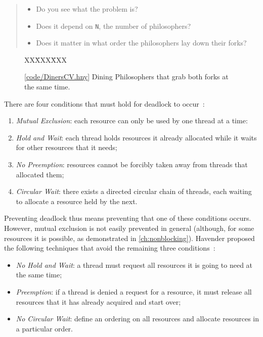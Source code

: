 \documentclass{report}
\newcommand{\harmonysource}[1]{
\begin{tabbing}
XX\=XXX\=XXX\kill
    
\end{tabbing}
}
\newcommand{\harmonylink}[1]{%
[\href{https://harmony.cs.cornell.edu/#1}{\underline{#1}}]%
}
\newenvironment{code}{
\tcolorbox
}{
\endtcolorbox
}
\begin{document}
\begin{quote}
\begin{itemize}
\item Do you see what the problem is?
\item Does it depend on \texttt{N}, the number of philosophers?
\item Does it matter in what order the philosophers lay down their forks?
\end{itemize}
\end{quote}


\begin{figure}
\begin{code}
\harmonysource{DinersCV}
\end{code}
\caption{\harmonylink{code/DinersCV.hny} Dining Philosophers that grab both forks at the same time.}
\label{fig:dinerscv}
\end{figure}

\noindent
There are four conditions that must hold for deadlock to occur~\cite{CES71}:
\begin{enumerate}
\item \emph{Mutual Exclusion}: each resource can only be used by one thread at a time:
\item \emph{Hold and Wait}: each thread holds resources it already allocated while it
waits for other resources that it needs;
\item \emph{No Preemption}: resources cannot be forcibly taken away from threads that
allocated them;
\item \emph{Circular Wait}: there exists a directed circular chain of threads, each waiting
to allocate a resource held by the next.
\end{enumerate}

Preventing deadlock thus means preventing that one of these conditions occurs.
However, mutual exclusion is not easily prevented in general
(although, for some resources it is
possible, as demonstrated in \autoref{ch:nonblocking}).
Havender proposed the following techniques that avoid the remaining
three conditions~\cite{Havender68}:

\begin{itemize}
\item \emph{No Hold and Wait}: a thread must request all resources it is going to
need at the same time;
\item \emph{Preemption}: if a thread is denied a request for a resource, it must
release all resources that it has already acquired and start over;
\item \emph{No Circular Wait}: define an ordering on all resources and allocate
resources in a particular order.
\end{itemize}
\end{document}
